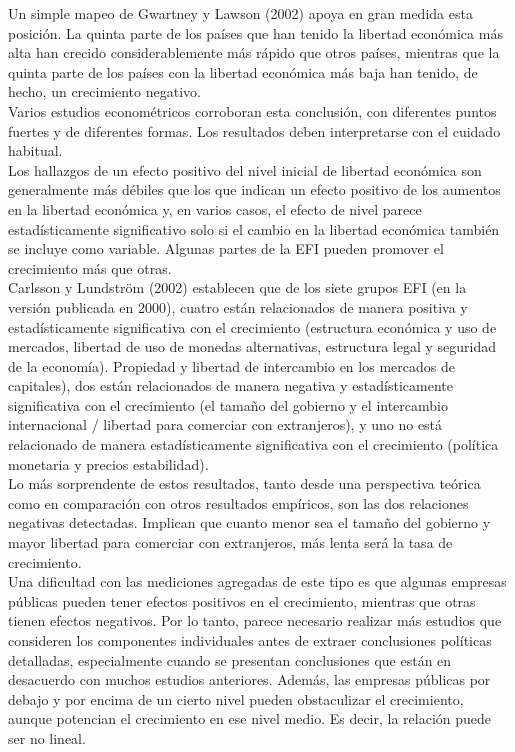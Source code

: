     Un simple mapeo de Gwartney y Lawson (2002) apoya en gran medida esta posición. La quinta parte de los países que han tenido la libertad económica más alta han crecido considerablemente más rápido que otros países, mientras que la quinta parte de los países con la libertad económica más baja han tenido, de hecho, un crecimiento negativo. \\
    Varios estudios econométricos corroboran esta conclusión, con diferentes puntos fuertes y de diferentes formas. Los resultados deben interpretarse con el cuidado habitual. \\
    Los hallazgos de un efecto positivo del nivel inicial de libertad económica son generalmente más débiles que los que indican un efecto positivo de los aumentos en la libertad económica y, en varios casos, el efecto de nivel parece estadísticamente significativo solo si el cambio en la libertad económica también se incluye como variable. Algunas partes de la EFI pueden promover el crecimiento más que otras. \\
    Carlsson y Lundström (2002) establecen que de los siete grupos EFI (en la versión publicada en 2000), cuatro están relacionados de manera positiva y estadísticamente significativa con el crecimiento (estructura económica y uso de mercados, libertad de uso de monedas alternativas, estructura legal y seguridad de la economía). Propiedad y libertad de intercambio en los mercados de capitales), dos están relacionados de manera negativa y estadísticamente significativa con el crecimiento (el tamaño del gobierno y el intercambio internacional / libertad para comerciar con extranjeros), y uno no está relacionado de manera estadísticamente significativa con el crecimiento (política monetaria y precios estabilidad).\\
    Lo más sorprendente de estos resultados, tanto desde una perspectiva teórica como en comparación con otros resultados empíricos,  son las dos relaciones negativas detectadas. Implican que cuanto menor sea el tamaño del gobierno y mayor libertad para comerciar con extranjeros, más lenta será la tasa de crecimiento. \\
    Una dificultad con las mediciones agregadas de este tipo es que algunas empresas públicas pueden tener efectos positivos en el crecimiento, mientras que otras tienen efectos negativos. Por lo tanto, parece necesario realizar más estudios que consideren los componentes individuales antes de extraer conclusiones políticas detalladas, especialmente cuando se presentan conclusiones que están en desacuerdo con muchos estudios anteriores. Además, las empresas públicas por debajo y por encima de un cierto nivel pueden obstaculizar el crecimiento, aunque potencian el crecimiento en ese nivel medio. Es decir, la relación puede ser no lineal.\\
